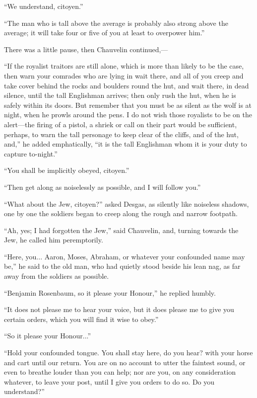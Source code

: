 \enquote{We understand, citoyen.}

\enquote{The man who is tall above the average is probably also strong above the average; it will take four or five of you at least to overpower him.}

There was a little pause, then Chauvelin continued,---

\enquote{If the royalist traitors are still alone, which is more than likely to be the case, then warn your comrades who are lying in wait there, and all of you creep and take cover behind the rocks and boulders round the hut, and wait there, in dead silence, until the tall Englishman arrives; then only rush the hut, when he is safely within its doors. But remember that you must be as silent as the wolf is at night, when he prowls around the pens. I do not wish those royalists to be on the alert---the firing of a pistol, a shriek or call on their part would be sufficient, perhaps, to warn the tall personage to keep clear of the cliffs, and of the hut, and,} he added emphatically, \enquote{it is the tall Englishman whom it is your duty to capture to-night.}

\enquote{You shall be implicitly obeyed, citoyen.}

\enquote{Then get along as noiselessly as possible, and I will follow you.}

\enquote{What about the Jew, citoyen?} asked Desgas, as silently like noiseless shadows, one by one the soldiers began to creep along the rough and narrow footpath.

\enquote{Ah, yes; I had forgotten the Jew,} said Chauvelin, and, turning towards the Jew, he called him peremptorily.

\enquote{Here, you... Aaron, Moses, Abraham, or whatever your confounded name may be,} he said to the old man, who had quietly stood beside his lean nag, as far away from the soldiers as possible.

\enquote{Benjamin Rosenbaum, so it please your Honour,} he replied humbly.

\enquote{It does not please me to hear your voice, but it does please me to give you certain orders, which you will find it wise to obey.}

\enquote{So it please your Honour...}

\enquote{Hold your confounded tongue. You shall stay here, do you hear? with your horse and cart until our return. You are on no account to utter the faintest sound, or even to breathe louder than you can help; nor are you, on any consideration whatever, to leave your post, until I give you orders to do so. Do you understand?}

